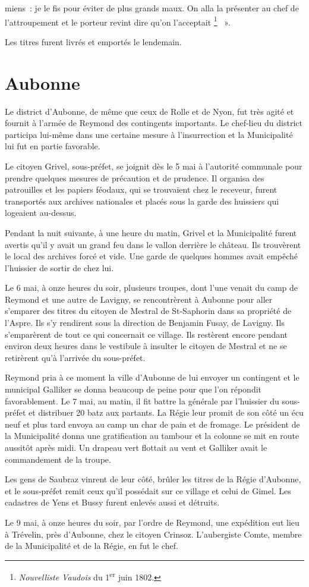 \documentclass[french,twoside]{book} %
\newenvironment{quoteblock}%
  {\begin{quoting}}
  {\end{quoting}}
\newenvironment{quotebar}{%
    \def\FrameCommand{{\color{rubric!10!}\vrule width 0.5em} \hspace{0.9em}}%
    \def\OuterFrameSep{\itemsep} %
    \MakeFramed {\advance\hsize-\width \FrameRestore}
  }%
  {%
    \endMakeFramed
  }
\renewenvironment{quoteblock}%
  {%
    \savenotes
    \setstretch{0.9}
    \normalfont
    \begin{quotebar}
  }
  {%
    \end{quotebar}
    \spewnotes
  }
\begin{document}
\begin{quoteblock}
miens : je le fis pour éviter de plus grands maux. On alla la présenter au chef de l’attroupement et le porteur revint dire qu’on l’acceptait \footnote{\emph{Nouvelliste Vaudois} du 1\textsuperscript{er} juin 1802.}  ».
 \end{quoteblock}

\noindent Les titres furent livrés et emportés le lendemain.
\section[Aubonne]{Aubonne}
\noindent Le district d’Aubonne, de même que ceux de Rolle et de Nyon, fut très agité et fournit à l’armée de Reymond des contingents importants. Le chef-lieu du district participa lui-même dans une certaine mesure à l’insurrection et la Municipalité lui fut en partie favorable.\par
Le citoyen Grivel, sous-préfet, se joignit dès le 5 mai à l’autorité communale pour prendre quelques mesures de précaution et de prudence. Il organisa des patrouilles et les papiers féodaux, qui se trouvaient chez le receveur, furent transportés aux archives nationales et placés sous la garde des huissiers qui logeaient au-dessus.\par
Pendant la nuit suivante, à une heure du matin, Grivel et la Municipalité furent avertis qu’il y avait un grand feu dans le vallon derrière le château. Ils trouvèrent le local des archives forcé et vide. Une garde de quelques hommes avait empêché l’huissier de sortir de chez lui.\par
Le 6 mai, à onze heures du soir, plusieurs troupes, dont l’une venait du camp de Reymond et une autre de Lavigny, se rencontrèrent à Aubonne pour aller s’emparer des titres du citoyen de Mestral de St-Saphorin dans sa propriété de l’Aspre. Ils s’y rendirent sous la direction de Benjamin Fusay, de Lavigny. Ils s’emparèrent de tout ce qui concernait ce village. Ils restèrent encore pendant environ deux heures dans le vestibule à insulter le citoyen de Mestral et ne se retirèrent qu’à l’arrivée du sous-préfet.\par
Reymond pria à ce moment la ville d’Aubonne de lui envoyer un contingent et le municipal Galliker se donna beaucoup de peine pour que l’on répondit favorablement. Le 7 mai, au matin, il fit battre la générale par l’huissier du sous-préfet et distribuer 20 batz aux partants. La Régie leur promit de son côté un écu neuf et plus tard envoya au camp un char de pain et de fromage. Le président de la Municipalité donna une gratification au tambour et la colonne se mit en route aussitôt après midi. Un drapeau vert flottait au vent et Galliker avait le commandement de la troupe.\par
Les gens de Saubraz vinrent de leur côté, brûler les titres de la Régie d’Aubonne, et le sous-préfet remit ceux qu’il possédait sur ce village et celui de Gimel. Les cadastres de Yens et Bussy furent enlevés aussi et détruits.\par
Le 9 mai, à onze heures du soir, par l’ordre de Reymond, une expédition eut lieu à Trévelin, près d’Aubonne, chez le citoyen Crinsoz. L’aubergiste Comte, membre de la Municipalité et de la Régie, en fut le chef.\par
\end{document}
